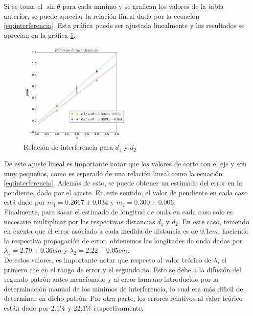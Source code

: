 \documentclass[prb,aps,twocolumn,preprintnumbers,amsmath,amssymb]{revtex4}
\begin{document}
Si se toma el $\sin{\theta}$ para cada mínimo y se grafican los valores de la tabla anterior, se puede apreciar la relación lineal dada por la ecuación \eqref{eq:interferencia}. Esta gráfica puede ser ajustada linealmente y los resultados se aprecian en  la gráfica \ref{fig:inter3}.\\

\begin{figure}[h!]
	\centering
	\includegraphics[width=0.5\textwidth]{inter3}
	\caption{Relación de interferencia para $d_1$ y $d_2$}
	\label{fig:inter3}
\end{figure}

De este ajuste lineal es importante notar que los valores de corte con el eje y son muy pequeños, como es esperado de una relación lineal como la ecuación \ref{eq:interferencia}. Además de esto, se puede obtener un estimado del error en la pendiente, dado por el ajuste. En este sentido, el valor de pendiente  en cada caso está dado por $m_1 = 0.2667 \pm 0.034$ y $m_2 = 0.300 \pm 0.006$. \\

Finalmente, para sacar el estimado de longitud de onda en cada caso solo es necesario multiplicar por las respectivas distancias $d_1$ y $d_2$. En este caso, teniendo en cuenta que el error asociado a cada medida de distancia es de $0.1cm$, haciendo la respectiva propagación de error, obtenemos las longitudes de onda dadas por $\lambda_1 = 2.79 \pm 0.36cm$ y $\lambda_2 = 2.22 \pm 0.05cm$.\\

De estos valores, es importante notar que respecto al valor teórico de $\lambda$, el primero cae en el rango de error y el segundo no. Esto se debe a la difusión del segundo patrón antes mencionado y al error humano introducido por la determinación manual de los mínimos de interferencia, lo cual era más dificil de determinar en dicho patrón. Por otra parte, los errores relativos al valor teórico están dado por $2.1\%$ y $22.1\%$ respectivamente.
\end{document}

